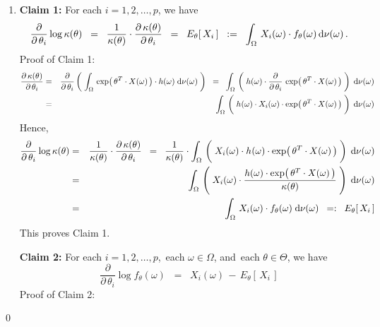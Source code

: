 \begin{enumerate}
\item
	\textbf{Claim 1:}\quad
	For each $i = 1, 2, \ldots, p$, we have
	\begin{equation*}
	\dfrac{\partial}{\partial\,\theta_{i}} \log \kappa(\theta)
	\;\; = \;\;
		\dfrac{1}{\kappa(\theta)} \cdot \dfrac{\partial\,\kappa(\theta)}{\partial\,\theta_{i}}
	\;\; = \;\;
		E_{\theta}\!\left[\,X_{i}\,\right]
	\;\; := \;\;
		\int_{\Omega}\, X_{i}(\omega) \cdot f_{\theta}(\omega)\,\textnormal{d}\nu(\omega)\,.
	\end{equation*}
	Proof of Claim 1:\quad
	\begin{eqnarray*}
	\dfrac{\partial\,\kappa(\theta)}{\partial\,\theta_{i}}
	& = &
		\dfrac{\partial}{\partial\,\theta_{i}}
		\left(\;
			\int_{\Omega}\,
			\exp\!\left(\,\theta^{T}\cdot X(\omega)\,\right)\cdot h(\omega)
			\;\d\nu(\omega)
		\;\right)
	\;\; = \;\;
		\int_{\Omega}\,
			\left(\;
			h(\omega)
			\cdot
			\dfrac{\partial}{\partial\,\theta_{i}}\,
			\exp\!\left(\,\theta^{T}\cdot X(\omega)\,\right)
			\;\right)
		\;\d\nu(\omega)
	\\
	&=&
		\int_{\Omega}\,
			\left(\;
			\overset{{\color{white}-}}{h}(\omega)
			\cdot
			X_{i}(\omega)
			\cdot
			\exp\!\left(\,\theta^{T}\cdot X(\omega)\,\right)
			\;\right)
		\;\d\nu(\omega)
	\end{eqnarray*}
	Hence,
	\begin{eqnarray*}
	\dfrac{\partial}{\partial\,\theta_{i}} \log \kappa(\theta)
	&=&
		\dfrac{1}{\kappa(\theta)} \cdot \dfrac{\partial\,\kappa(\theta)}{\partial\,\theta_{i}}
	\;\; = \;\;
		\dfrac{1}{\kappa(\theta)}
		\cdot
		\int_{\Omega}\,
			\left(\;
			X_{i}(\omega)
			\cdot
			\overset{{\color{white}-}}{h}(\omega)
			\cdot
			\exp\!\left(\,\theta^{T}\cdot X(\omega)\,\right)
			\;\right)
		\;\d\nu(\omega)
	\\
	& = &
		\int_{\Omega}\,
			\left(\;
			X_{i}(\omega)
			\cdot
			\dfrac{
				h(\omega) \cdot \exp\!\left(\,\theta^{T}\cdot X(\omega)\,\right)
				}{
				\kappa(\theta)
				}
			\;\right)
		\;\d\nu(\omega)
	\\
	& = &
		\int_{\Omega}\,
			X_{i}(\omega) \cdot f_{\theta}(\omega)
		\;\d\nu(\omega)
	\;\; =: \;\;
		E_{\theta}\!\left[\,X_{i}\,\right]
	\end{eqnarray*}
	This proves Claim 1.
	
	\vskip 0.5cm
	\noindent
	\textbf{Claim 2:}\quad
	For each $i = 1, 2, \ldots, p$, \,each $\omega\in\Omega$, and \,each $\theta\in\Theta$, we have
	\begin{equation*}
	\dfrac{\partial}{\partial\,\theta_{i}} \log f_{\theta}(\omega)
	\;\; = \;\;
		X_{i}(\omega) \, - \, E_{\theta}\!\left[\,X_{i}\,\right]
	\end{equation*}
	Proof of Claim 2:\quad
\end{enumerate}
\qed


\renewcommand{\theenumi}{\roman{enumi}}
\renewcommand{\labelenumi}{\textnormal{(\theenumi)}$\;\;$}

